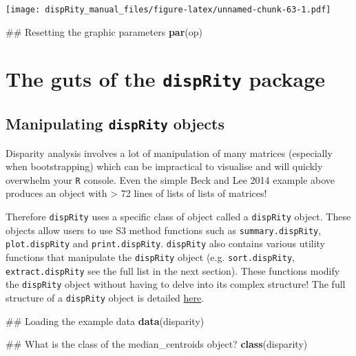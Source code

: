 \documentclass[]{book}
\newenvironment{Shaded}{\begin{snugshade}}{\end{snugshade}}
\newcommand{\KeywordTok}[1]{\textcolor[rgb]{0.13,0.29,0.53}{\textbf{#1}}}
\newcommand{\NormalTok}[1]{#1}
\theoremstyle{definition}
\theoremstyle{definition}
\theoremstyle{remark}
\begin{document}
\texttt{[image: dispRity\_manual\_files/figure-latex/unnamed-chunk-63-1.pdf]}

\begin{Shaded}
\begin{Highlighting}[]
\NormalTok{## Resetting the graphic parameters}
\KeywordTok{par}\NormalTok{(op)}
\end{Highlighting}
\end{Shaded}

\chapter{\texorpdfstring{The guts of the \texttt{dispRity}
package}{The guts of the dispRity package}}\label{the-guts-of-the-disprity-package}

\section{\texorpdfstring{Manipulating \texttt{dispRity}
objects}{Manipulating dispRity objects}}\label{manipulating-disprity-objects}

Disparity analysis involves a lot of manipulation of many matrices
(especially when bootstrapping) which can be impractical to visualise
and will quickly overwhelm your \texttt{R} console. Even the simple Beck
and Lee 2014 example above produces an object with \textgreater{} 72
lines of lists of lists of matrices!

Therefore \texttt{dispRity} uses a specific class of object called a
\texttt{dispRity} object. These objects allow users to use S3 method
functions such as \texttt{summary.dispRity}, \texttt{plot.dispRity} and
\texttt{print.dispRity}. \texttt{dispRity} also contains various utility
functions that manipulate the \texttt{dispRity} object (e.g.
\texttt{sort.dispRity}, \texttt{extract.dispRity} see the full list in
the next section). These functions modify the \texttt{dispRity} object
without having to delve into its complex structure! The full structure
of a \texttt{dispRity} object is detailed
\href{https://github.com/TGuillerme/dispRity/blob/master/disparity_object.md}{here}.

\begin{Shaded}
\begin{Highlighting}[]
\NormalTok{## Loading the example data}
\KeywordTok{data}\NormalTok{(disparity)}

\NormalTok{## What is the class of the median_centroids object?}
\KeywordTok{class}\NormalTok{(disparity)}
\end{Highlighting}
\end{Shaded}
\end{document}
